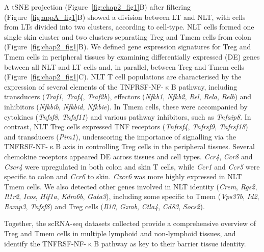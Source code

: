 A tSNE projection (Figure~\ref{fig:chap2_fig1}B) after filtering (Figure~\ref{fig:appA_fig1}B) showed a division between LT and NLT, with cells from LTs divided into two clusters, according to cell-type. NLT cells formed one single skin cluster and two clusters separating Treg and Tmem cells from colon (Figure~\ref{fig:chap2_fig1}B). We defined gene expression signatures for Treg and Tmem cells in peripheral tissues by examining differentially expressed (DE) genes between all NLT and LT cells and, in parallel, between Treg and Tmem cells (Figure~\ref{fig:chap2_fig1}C). NLT T cell populations are characterised by the expression of several elements of the TNFRSF-NF-${\upkappa}$B pathway, including transducers (\textit{Traf1}, \textit{Traf4}, \textit{Traf2b}), effectors (\textit{Nfkb1}, \textit{Nfkb2}, \textit{Rel}, \textit{Rela}, \textit{Relb}) and inhibitors (\textit{Nfkbib}, \textit{Nfkbid}, \textit{Nfkbie}). In Tmem cells, these were accompanied by cytokines (\textit{Tnfsf8}, \textit{Tnfsf11}) and various pathway inhibitors, such as \textit{Tnfaip8}. In contrast, NLT Treg cells expressed TNF receptors (\textit{Tnfrsf4}, \textit{Tnfrsf9}, \textit{Tnfrsf18}) and transducers (\textit{Pim1}), underscoring the importance of signalling via the TNFRSF-NF-${\upkappa}$B axis in controlling Treg cells in the peripheral tissues. Several chemokine receptors appeared DE across tissues and cell types. \textit{Ccr4}, \textit{Ccr8} and \textit{Cxcr4} were upregulated in both colon and skin T cells, while \textit{Ccr1} and \textit{Ccr5} were specific to colon and \textit{Ccr6} to skin. \textit{Cxcr6} was more highly expressed in NLT Tmem cells. We also detected other genes involved in NLT identity (\textit{Crem}, \textit{Rgs2}, \textit{Il1r2}, \textit{Icos}, \textit{Hif1a}, \textit{Kdm6b}, \textit{Gata3}), including some specific to Tmem (\textit{Vps37b}, \textit{Id2}, \textit{Ramp3}, \textit{Tnfsf8}) and Treg cells (\textit{Il10}, \textit{Gzmb}, \textit{Ctla4}, \textit{Cd83}, \textit{Socs2}).

Together, the scRNA-seq datasets collected provide a comprehensive overview of Treg and Tmem cells in multiple lymphoid and non-lymphoid tissues, and identify the TNFRSF-NF-${\upkappa}$B pathway as key to their barrier tissue identity.




